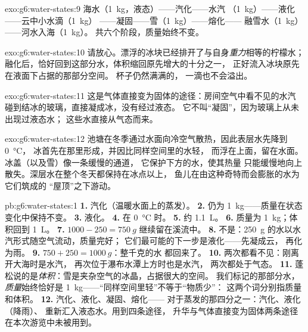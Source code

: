 \begin{solution}{exo:g6:water-states:9}
海水（\qty{1}{kg}，液态）——汽化——水汽
（\qty{1}{kg}）——液化——云中小水滴（\qty{1}{kg}）
——凝固——雪（\qty{1}{kg}）——熔化——
融雪水（\qty{1}{kg}）——河水入海（\qty{1}{kg}）。
共六个阶段，质量始终不变。
\end{solution}

\begin{solution}{exo:g6:water-states:10}
请放心。漂浮的冰块已经排开了与自身\emph{重力}相等的柠檬水；
融化后，恰好回到这部分水，体积缩回原先增大的十分之一，
正好流入冰块原先在液面下占据的那部分空间。
杯子仍然满满的，
一滴也不会溢出。
\end{solution}

\begin{solution}{exo:g6:water-states:11}
这是气体直接变为固体的途径：房间空气中看不见的水汽
碰到结冰的玻璃，直接凝成冰，没有经过液态。
它不叫“凝固”，因为玻璃上从未出现过液态水；
这些水直接从气态而来。
\end{solution}

\begin{solution}{exo:g6:water-states:12}
池塘在冬季通过水面向冷空气散热，因此表层水先降到 \qty{0}{\celsius}，
冰首先在那里形成，并因比同样空间里的水轻，
而浮在上面，留在水面。冰盖（以及雪）像一条缓慢的通道，
它保护下方的水，使其热量
只能缓慢地向上
散失。深层水在整个冬天都保持在冰点以上，
鱼儿在由这种奇特而会膨胀的水为它们筑成的
“屋顶”之下游动。
\end{solution}

\begin{solution}{pb:g6:water-states:1}
\textbf{1.} 汽化（温暖水面上的蒸发）。
\textbf{2.} 仍为 \qty{1}{kg}——质量在状态变化中保持不变。
\textbf{3.} 液化。
\textbf{4.} 在 \qty{0}{\celsius} 时。
\textbf{5.} 约 \qty{1.1}{L}。
\textbf{6.} 质量为 \qty{1}{kg}；体积回到 \qty{1}{L}。
\textbf{7.} $1000 - 250 = \qty{750}{g}$ 继续留在溪流中。
\textbf{8.} 不是：\qty{250}{g} 的水以水汽形式随空气流动，质量完好；
它们最可能的下一步是液化——先凝成云，
再化为雨。
\textbf{9.} $750 + 250 = \qty{1000}{g}$：整千克的水
都回来了。
\textbf{10.} 两次都看不见：刚离开大海时是水汽，
再次位于瀑布水潭上方时也是水汽，
两次都处于气态。
\textbf{11.} 蓬松说的是\emph{体积}：雪是夹杂空气的冰晶，占据很大的空间。
我们标记的那部分水，\emph{质量}始终恰好是
\qty{1}{kg}——“同样空间里轻”不等于“物质少”：
这两个词分别指质量和体积。
\textbf{12.} 汽化、液化、凝固、熔化——
对于蒸发的那四分之一：汽化、液化（降雨）、
重新汇入液态水。用到四条途径，
升华与气体直接变为固体两条途径在本次游览中未被用到。
\end{solution}
